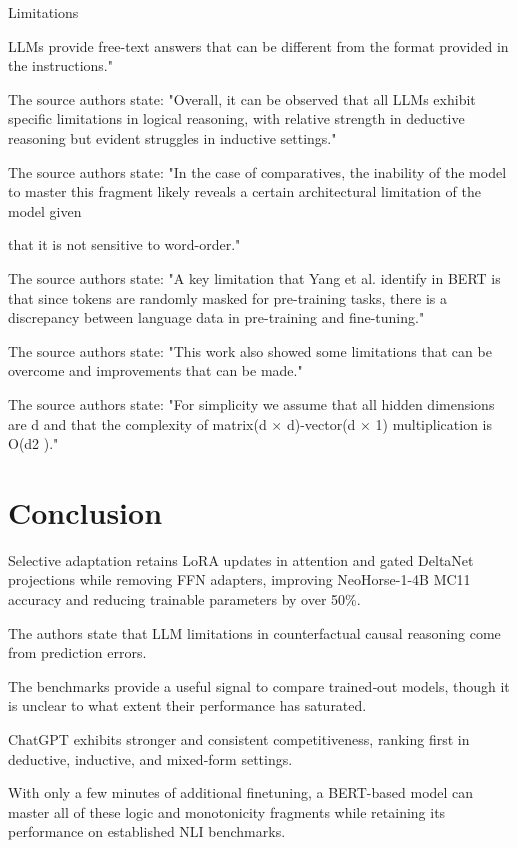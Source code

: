 \documentclass{article}\usepackage{amsmath,amssymb,graphicx,url}
\begin{document}
Limitations

LLMs provide free-text answers that can be different from the format provided in the instructions." \cite{gendron2024counterfactual}

The source authors state: "Overall, it can be observed that all LLMs exhibit specific
limitations in logical reasoning, with relative strength in
deductive reasoning but evident struggles in inductive
settings." \cite{xu2023large}

The source authors state: "In the case of comparatives, the inability of the model to master this fragment likely
reveals a certain architectural limitation of the model given

that it is not sensitive to word-order." \cite{richardson2020probing}

The source authors state: "A key limitation that Yang et al. identify
in BERT is that since tokens are randomly masked for pre-training tasks, there is a discrepancy
between language data in pre-training and fine-tuning." \cite{storks2019recent}

The source authors state: "This work also showed some limitations that can be
overcome and improvements that can be made." \cite{raju2017dynamic}

The source authors state: "For simplicity we assume that all hidden dimensions are d and that the complexity of
matrix(d × d)-vector(d × 1) multiplication is O(d2 )." \cite{parikh2016decomposable}

\section{Conclusion}
Selective adaptation retains LoRA updates in attention and gated DeltaNet projections while removing FFN adapters, improving NeoHorse-1-4B MC11 accuracy and reducing trainable parameters by over 50\%. \cite{mei2026improving}

The authors state that LLM limitations in counterfactual causal reasoning come from prediction errors. \cite{gendron2024counterfactual}

The benchmarks provide a useful signal to compare trained‑out models, though it is unclear to what extent their performance has saturated. \cite{madaan2024lost}

ChatGPT exhibits stronger and consistent competitiveness, ranking first in deductive, inductive, and mixed-form settings. \cite{xu2023large}

With only a few minutes of additional finetuning, a BERT-based model can master all of these logic and monotonicity fragments while retaining its performance on established NLI benchmarks. \cite{richardson2020probing}
\end{document}
